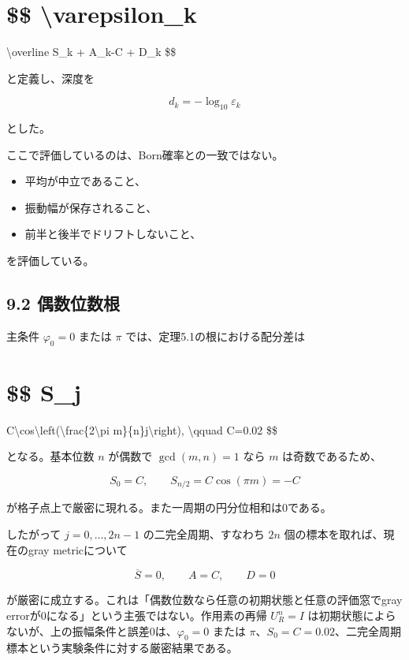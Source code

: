 \documentclass[
  a4paper,
  10pt]{article}
\providecommand{\tightlist}{%
  \setlength{\itemsep}{0pt}\setlength{\parskip}{0pt}}
\begin{document}
\section{\$\$ \textbackslash varepsilon\_k}\label{-varepsilon_k}

\textbar\textbackslash overline S\_k\textbar{} +
\textbar A\_k-C\textbar{} + D\_k \$\$

と定義し、深度を

\[
d_k=-\log_{10}\varepsilon_k
\]

とした。

ここで評価しているのは、Born確率との一致ではない。

\begin{itemize}
\tightlist
\item
  平均が中立であること、
\item
  振動幅が保存されること、
\item
  前半と後半でドリフトしないこと、
\end{itemize}

を評価している。

\subsection{9.2 偶数位数根}\label{92-ux5076ux6570ux4f4dux6570ux6839}

主条件 \(\varphi_0=0\) または \(\pi\) では、定理5.1の根における配分差は

\section{\$\$ S\_j}\label{-s_j}

C\textbackslash cos\textbackslash left(\textbackslash frac\{2\textbackslash pi
m\}\{n\}j\textbackslash right), \textbackslash qquad C=0.02 \$\$

となる。基本位数 \(n\) が偶数で \(\gcd(m,n)=1\) なら \(m\)
は奇数であるため、

\[
S_0=C,
\qquad
S_{n/2}=C\cos(\pi m)=-C
\]

が格子点上で厳密に現れる。また一周期の円分位相和は0である。

したがって \(j=0,\ldots,2n-1\) の二完全周期、すなわち \(2n\)
個の標本を取れば、現在のgray metricについて

\[
\overline S=0,
\qquad
A=C,
\qquad
D=0
\]

が厳密に成立する。これは「偶数位数なら任意の初期状態と任意の評価窓でgray
errorが0になる」という主張ではない。作用素の再帰 \(U_R^n=I\)
は初期状態によらないが、上の振幅条件と誤差0は、\(\varphi_0=0\) または
\(\pi\)、\(S_0=C=0.02\)、二完全周期標本という実験条件に対する厳密結果である。
\end{document}

